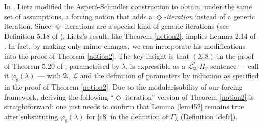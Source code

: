 \documentclass[12pt]{article}
\numberwithin{equation}{section}
\begin{document}
In \cite{lietz}, Lietz modified the Asper\'{o}-Schindler construction to obtain, under the same set of assumptions, a forcing notion that adds a $\Diamond$\emph{-iteration} instead of a generic iteration. Since $\Diamond$-iterations are a special kind of generic iterations (see Definition 5.18 of \cite{lietz}), Lietz's result, like Theorem \ref{notion2}, implies Lemma 2.14 of \cite{schindler}. In fact, by making only minor changes, we can incorporate his modifications into the proof of Theorem \ref{notion2}. The key insight is that $(\Sigma.8)$ in the proof of Theorem 5.20 of \cite{lietz}, parametrised by $\lambda$, is expressible as a $\mathcal{L}^*_{\mathfrak{A}}$-$\Pi_2$ sentence --- call it $\varphi_8(\lambda)$ --- with $\mathfrak{A}$, $\mathcal{L}$ and the definition of parameters by induction as specified in the proof of Theorem \ref{notion2}. Due to the modularisability of our forcing framework, deriving the following ``$\Diamond$-iteration'' version of Theorem \ref{notion2} is straightforward: one just needs to confirm that Lemma \ref{lem452} remains true after substituting $\varphi_8(\lambda)$ for \ref{c8} in the definition of $\Gamma_{\lambda}$ (Definition \ref{defc}).
\end{document}
